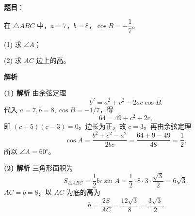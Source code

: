 \begin{answer}

\textbf{题目}：

在 $\triangle ABC$ 中，$a=7$，$b=8$，$\cos B=-\dfrac17$。

(1) 求 $\angle A$；

(2) 求 $AC$ 边上的高。

\textbf{解析}

\textbf{(1) 解析} 由余弦定理
\nopagebreak[4]
\[
b^2=a^2+c^2-2ac\cos B.
\]
代入 $a=7,b=8,\cos B=-1/7$，得
\nopagebreak[4]
\[
64=49+c^2+2c,
\]
即 $(c+5)(c-3)=0$。边长为正，故 $c=3$。再由余弦定理
\nopagebreak[4]
\[
\cos A=\frac{b^2+c^2-a^2}{2bc}
=\frac{64+9-49}{48}=\frac12,
\]
所以 $\angle A=60^\circ$。

\textbf{(2) 解析} 三角形面积为
\nopagebreak[4]
\[
S_{\triangle ABC}=\frac12bc\sin A
=\frac12\cdot8\cdot3\cdot\frac{\sqrt3}{2}=6\sqrt3.
\]
$AC=b=8$，以 $AC$ 为底的高为
\nopagebreak[4]
\[
h=\frac{2S}{AC}=\frac{12\sqrt3}{8}=\frac{3\sqrt3}{2}.
\]



\end{answer}
